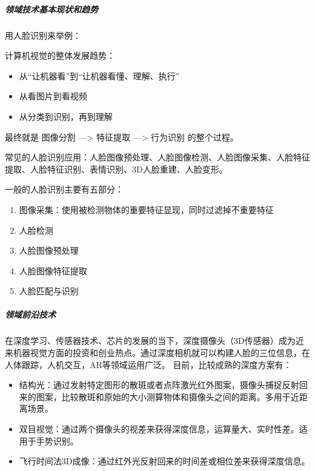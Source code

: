 \documentclass[letterpaper,10pt,english]{sphinxmanual}
\begin{document}
\subparagraph{领域技术基本现状和趋势}
\label{\detokenize{chapter_idea/understand_tech:id35}}
用人脸识别来举例：

计算机视觉的整体发展趋势：
\begin{itemize}
\item {} 
从“让机器看”到“让机器看懂、理解、执行”

\item {} 
从看图片到看视频

\item {} 
从分类到识别，再到理解

\end{itemize}

最终就是 图像分割 —\sphinxhyphen{}> 特征提取 —\sphinxhyphen{}> 行为识别 的整个过程。

常见的人脸识别应用：人脸图像预处理、人脸图像检测、人脸图像采集、人脸特征提取、人脸特征识别、表情识别、3D人脸重建、人脸变形。

一般的人脸识别主要有五部分：
\begin{enumerate}
%
\item {} 
图像采集：使用被检测物体的重要特征显现，同时过滤掉不重要特征

\item {} 
人脸检测

\item {} 
人脸图像预处理

\item {} 
人脸图像特征提取

\item {} 
人脸匹配与识别

\end{enumerate}


\subparagraph{领域前沿技术}
\label{\detokenize{chapter_idea/understand_tech:id36}}
在深度学习、传感器技术、芯片的发展的当下，深度摄像头（3D传感器）成为近来机器视觉方面的投资和创业热点。通过深度相机就可以构建人脸的三位信息，在人体跟踪，人机交互，AR等领域运用广泛。
目前，比较成熟的深度方案有：
\begin{itemize}
\item {} 
结构光：通过发射特定图形的散斑或者点阵激光红外图案，摄像头捕捉反射回来的图案，比较散斑和原始的大小测算物体和摄像头之间的距离。多用于近距离场景。

\item {} 
双目视觉：通过两个摄像头的视差来获得深度信息，运算量大、实时性差。适用于手势识别。

\item {} 
飞行时间法3D成像：通过红外光反射回来的时间差或相位差来获得深度信息。

\end{itemize}
\end{document}
